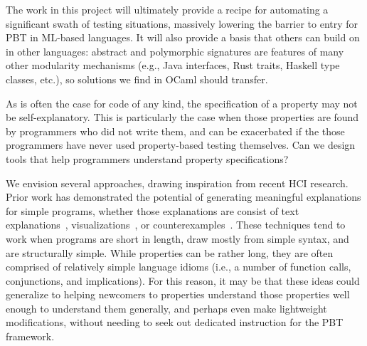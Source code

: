 The work in this project will ultimately provide a recipe for automating a
significant swath of testing situations, massively lowering the barrier to entry
for PBT in ML-based languages. It will also provide a basis that others can
build on in other languages: abstract and polymorphic signatures are features of
many other modularity mechanisms (e.g., Java interfaces, Rust traits, Haskell
type classes, etc.), so solutions we find in OCaml should transfer.

\iflater
{}
\fi

%
As is often the case for code of any kind, the specification of a property may
not be self-explanatory. This is particularly the case when those properties are
found by programmers who did not write them, and can be exacerbated if the those
programmers have never used property-based testing themselves. Can we design
tools that help programmers understand property specifications?

We envision several approaches, drawing inspiration from recent HCI research.
Prior work has demonstrated the potential of generating meaningful explanations
for simple programs, whether those explanations are consist of text
explanations~\cite{ref:head2015tutorons,ref:mayer2015user},
visualizations~\cite{ref:guo2013online}, or
counterexamples~\cite{ref:dantoni2015can}. These techniques tend to work when
programs are short in length, draw mostly from simple syntax, and are
structurally simple.  While properties can be rather long, they are often
comprised of relatively simple language idioms (i.e., a number of function
calls, conjunctions, and implications). For this reason, it may be that these
ideas could generalize to helping newcomers to properties understand those
properties well enough to understand them generally, and perhaps even make
lightweight modifications, without needing to seek out dedicated instruction for
the PBT framework.

